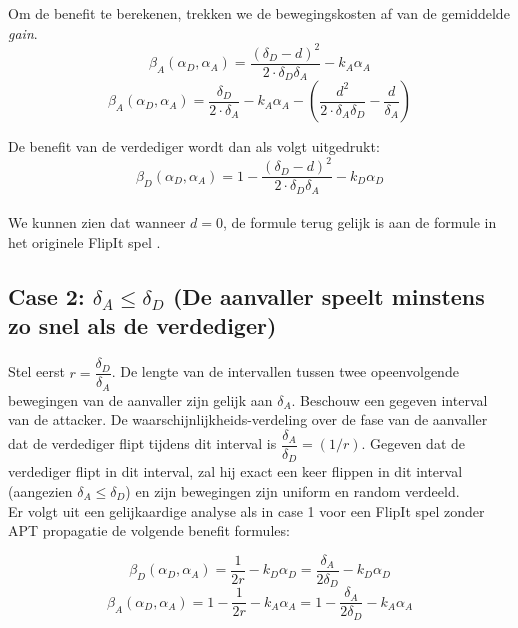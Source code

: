 \documentclass[master=cws, masteroption=vs,english]{kulemt}
\begin{document}
\begin{abstract*}
Om de benefit te berekenen, trekken we de bewegingskosten af van de gemiddelde \textit{gain}.
\begin{equation}\label{first}
\beta_{A}(\alpha_{D},\alpha_{A}) = \dfrac { (\delta_{D}-d) ^{2}} {2 \cdot \delta_{D}  \delta_{A}} - k_{A} \alpha_{A}
\end{equation}
\begin{equation}\label{first}
\beta_{A}(\alpha_{D},\alpha_{A}) = \dfrac { \delta_{D}} {2 \cdot \delta_{A}} - k_{A} \alpha_{A} - ( \dfrac{d^{2}}{2 \cdot \delta_{A} \delta_{D}} - \dfrac{d}{\delta_{A}} )
\end{equation}
 
 
De benefit van de verdediger wordt dan als volgt uitgedrukt:
 \begin{equation}\label{first}
\beta_{D}(\alpha_{D},\alpha_{A}) = 1 - \dfrac { (\delta_{D}-d) ^{2}} {2 \cdot \delta_{D}  \delta_{A}} - k_{D} \alpha_{D}
\end{equation}
~~\\
We kunnen zien dat wanneer $d=0$, de formule terug gelijk is aan de formule in het originele FlipIt spel \citep{FlipIt}. \\


\subsection*{\textbf{Case 2:} $\delta_{A} \leq \delta_{D} $ (De aanvaller speelt minstens zo snel als de verdediger)}

Stel eerst $r = \dfrac{\delta_{D}}{ \delta_{A} }$. De lengte van de intervallen tussen twee opeenvolgende bewegingen van de aanvaller zijn gelijk aan $\delta_{A}$. Beschouw een gegeven interval van de attacker. De waarschijnlijkheids-verdeling over de fase van de aanvaller dat de verdediger flipt tijdens dit interval is $\dfrac{\delta_{A}}{ \delta_{D} } = (1/r)$. Gegeven dat de verdediger flipt in dit interval, zal hij exact een keer flippen in dit interval (aangezien $\delta_{A} \leq \delta_{D} $) en zijn bewegingen zijn uniform en random verdeeld. \\

Er volgt uit een gelijkaardige analyse als in case 1 voor een FlipIt spel zonder APT propagatie de volgende benefit formules:

\begin{equation}\label{first}
\beta_{D}(\alpha_{D},\alpha_{A}) = \dfrac {1} {2r} - k_{D} \alpha_{D} = \dfrac {\delta_{A}} {2\delta_{D}} - k_{D} \alpha_{D} 
\end{equation}
\begin{equation}\label{first}
\beta_{A}(\alpha_{D},\alpha_{A}) =1 - \dfrac {1} {2r} - k_{A} \alpha_{A} = 1- \dfrac {\delta_{A}} {2\delta_{D}} - k_{A} \alpha_{A}  
\end{equation}\\


\end{abstract*}
\end{document}
